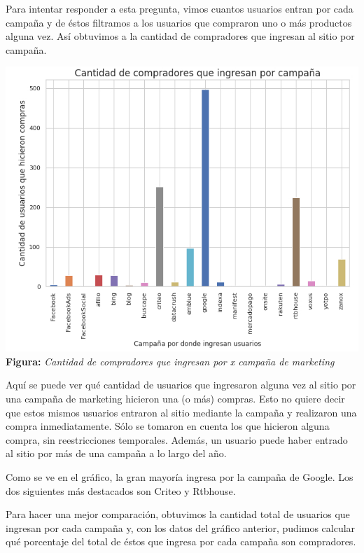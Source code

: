 \documentclass[titlepage,a4paper]{article}
\begin{document}
	Para intentar responder a esta pregunta, vimos cuantos usuarios entran por cada campaña y de éstos filtramos a los usuarios que compraron uno o más productos alguna vez. Así obtuvimos a la cantidad de compradores que ingresan al sitio por campaña.
	
	
	 \begin{center}
   \includegraphics[width=14cm]{compradoresPorCamp.jpg}\\
	\textbf{Figura:}  \textit{Cantidad de compradores que ingresan por \textit{x} campaña de marketing}
	\end{center}
	
		 Aquí se puede ver qué cantidad de usuarios que ingresaron alguna vez al sitio por una campaña de marketing hicieron una (o más) compras. Esto no quiere decir que estos mismos usuarios entraron al sitio mediante la campaña y realizaron una compra inmediatamente. Sólo se tomaron en cuenta los que hicieron alguna compra, sin reestricciones temporales. Además, un usuario puede haber entrado al sitio por más de una campaña a lo largo del año.
	
	Como se ve en el gráfico, la gran mayoría ingresa por la campaña de Google. Los dos siguientes más destacados son Criteo y Rtbhouse.
	
	Para hacer una mejor comparación, obtuvimos la cantidad total de usuarios que ingresan por cada campaña y, con los datos del gráfico anterior, pudimos calcular qué porcentaje del total de éstos que ingresa por cada campaña son compradores.
\end{document}
